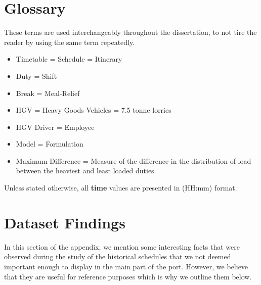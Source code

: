 \appendix
\chapter{Glossary}

These terms are used interchangeably throughout the dissertation, to not tire the reader by using the same term repeatedly.

\begin{itemize}
    \item Timetable = Schedule = Itinerary
    \item Duty = Shift 
    \item Break = Meal-Relief
    \item HGV = Heavy Goods Vehicles = 7.5 tonne lorries
    \item HGV Driver = Employee
    \item Model = Formulation 
    \item Maximum Difference \cite{maxdif} = Measure of the difference in the distribution of load between the heaviest and least loaded duties.
\end{itemize}

\vspace{\baselineskip}
\noindent
Unless stated otherwise, all \textbf{time} values are presented in (HH:mm) format. 
 

\chapter{Dataset Findings}
\label{chapter: second appendix}


\vspace{\baselineskip}
\noindent
In this section of the appendix, we mention some interesting facts that were observed during the study of the historical schedules that we not deemed important enough to display in the main part of the port. However, we believe that they are useful for reference purposes which is why we outline them below. 


